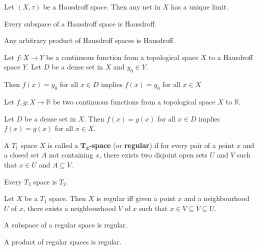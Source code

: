 \begin{thm}
    Let $(X,\tau)$ be a Hausdroff space. Then any net in $X$ has a unique limit.
\end{thm}

\begin{thm}
    Every subspace of a Hausdroff space is Hausdroff.
\end{thm}

\begin{thm}
    Any arbitrary product of Hausdroff spaces is Hausdroff.
\end{thm}

\begin{thm}
    Let $f: X \to Y$ be a continuous function from a topological space $X$ to a Hausdroff space $Y$. 
    Let $D$ be a dense set in $X$ and $y_0 \in Y$.

    Then $f(x) = y_0 $ for all $x \in D$ implies $f(x) = y_0$ for all $x \in X$ 
\end{thm}

\begin{thm}
    Let $f, g: X \to \mathbb{R}$ be two continuous functions from a topological space $X$ to $\mathbb{R}$.

    Let $D$ be a dense set in $X$. 
    Then $f(x) = g(x)$ for all $x \in D$ implies $f(x) = g(x)$ for all $x \in X$.
\end{thm}

\begin{defn}
    A $T_1$ space $X$ is called a \textbf{$\bm{T_3}$-space} (or \textbf{regular}) if for every pair of a point $x$ and a closed set $A$ not containing $x$, there exists two disjoint open sets $U$ and $V$ such that $x \in U$ and $A \subseteq V$.
\end{defn}

\begin{thm}
    Every $T_3$ space is $T_2$.
\end{thm}

\begin{thm}
    Let $X$ be a $T_1$ space. Then $X$ is regular iff given a point $x$ and a neighbourhood $U$ of $x$, there exists a neighbourhood $V$ of $x$ such that $x \in V \subseteq \overline{V} \subseteq U$.
\end{thm}

\begin{thm}
    A subspace of a regular space is regular.
\end{thm}

\begin{thm}
    A product of regular spaces is regular.
\end{thm}

